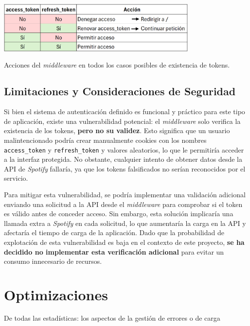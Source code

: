 \begin{table}[htbp]
    \centering
    \includegraphics[width=0.75\textwidth]{figures/implementacion/middleware_opciones.png}
    \captionsetup{skip=10pt}
    \caption{Acciones del \textit{middleware} en todos los casos posibles de existencia de tokens.}
    \label{tab:middleware_opciones}
\end{table}

\subsection{Limitaciones y Consideraciones de Seguridad}

Si bien el sistema de autenticación definido es funcional y práctico para este tipo de aplicación, existe una vulnerabilidad potencial: el \textit{middleware} solo verifica la existencia de los tokens, \textbf{pero no su validez}. Esto significa que un usuario malintencionado podría crear manualmente cookies con los nombres \texttt{access\_token} y \texttt{refresh\_token} y valores aleatorios, lo que le permitiría acceder a la interfaz protegida. No obstante, cualquier intento de obtener datos desde la API de \textit{Spotify} fallaría, ya que los tokens falsificados no serían reconocidos por el servicio.

Para mitigar esta vulnerabilidad, se podría implementar una validación adicional enviando una solicitud a la API desde el \textit{middleware} para comprobar si el token es válido antes de conceder acceso. Sin embargo, esta solución implicaría una llamada extra a \textit{Spotify} en cada solicitud, lo que aumentaría la carga en la API y afectaría el tiempo de carga de la aplicación. Dado que la probabilidad de explotación de esta vulnerabilidad es baja en el contexto de este proyecto, \textbf{se ha decidido no implementar esta verificación adicional} para evitar un consumo innecesario de recursos.


\section{Optimizaciones} \label{sec:optimizaciones}
De todas las estadísticas:
los aspectos de la gestión de errores o de carga

